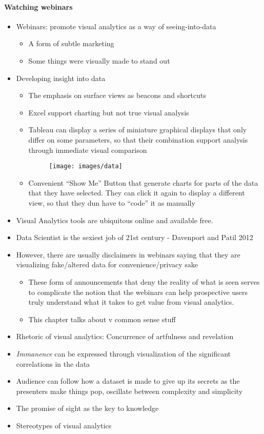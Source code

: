 \documentclass[a4paper]{article}
\begin{document}
\paragraph{Watching webinars}
\begin{itemize}
	\item Webinars: promote visual analytics as a way of seeing-into-data
	\begin{itemize}[label=$\circ$]
		\item A form of subtle marketing
		\item Some things were visually made to stand out
	\end{itemize}
	\item Developing insight into data
	\begin{itemize}[label=$\circ$]
		\item The emphasis on surface views as beacons and shortcuts
		\item Excel support charting but not true visual analysis
		\item Tableau can display a series of miniature graphical displays that only differ on some parameters, so that their combination support analysis through immediate visual comparison
		\begin{figure}[H]
			\centering
			\texttt{[image: images/data]}
		\end{figure}
		\item Convenient “Show Me” Button that generate charts for parts of the data that they have selected. They can click it again to display a different view, so that they dun have to ``code'' it as manually
	\end{itemize}
	\item Visual Analytics tools are ubiquitous online and available free.
	\item Data Scientist is the sexiest job of 21st century - Davenport and Patil 2012
	\item However, there are usually disclaimers in webinars saying that they are visualizing fake/altered data for convenience/privacy sake
	\begin{itemize}[label=$\circ$]
		\item These form of announcements that deny the reality of what is seen serves to complicate the notion that the webinars can help prospective users truly understand what it takes to get value from visual analytics.
		\item This chapter talks about v common sense stuff 
	\end{itemize}
	\item Rhetoric of visual analytics: Concurrence of artfulness and revelation
	\item \textit{Immanence} can be expressed through visualization of the significant correlations in the data
	\item Audience can follow how a dataset is made to give up its secrets as the presenters make things pop, oscillate between complexity and simplicity
	\item The promise of sight as the key to knowledge
	\item Stereotypes of visual analytics
\end{itemize}
\end{document}
